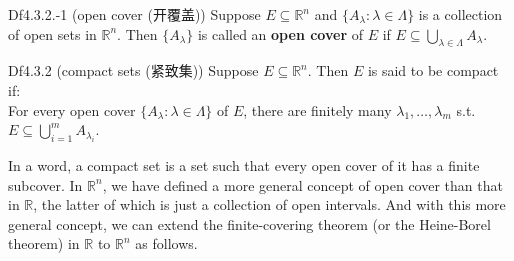 \documentclass{article}
\begin{document}
\begin{Df}{Df4.3.2.-1 (open cover (开覆盖))}
    Suppose $E\subseteq\mathbb{R}^n$ and $\{A_\lambda: \lambda\in\Lambda\}$ is a collection of open sets in $\mathbb{R}^n$. Then $\{A_\lambda\}$ is called an \textbf{open cover} of $E$ if $E\subseteq\bigcup\limits_{\lambda\in\Lambda} A_\lambda$.
\end{Df}

\begin{Df}{Df4.3.2 (compact sets (紧致集))}
    Suppose $E\subseteq\mathbb{R}^n$. Then $E$ is said to be compact if: \\
    For every open cover $\{A_\lambda: \lambda\in\Lambda\}$ of $E$, there are finitely many $\lambda_1, \dots, \lambda_m$ s.t. $E\subseteq \bigcup_{i=1}^m A_{\lambda_i}$.
\end{Df}

\begin{Rmk}{}
    In a word, a compact set is a set such that every open cover of it has a finite subcover. In $\mathbb{R}^n$, we have defined a more general concept of open cover than that in $\mathbb{R}$, the latter of which is just a collection of open intervals. And with this more general concept, we can extend the finite-covering theorem (or the Heine-Borel theorem) in $\mathbb{R}$ to $\mathbb{R}^n$ as follows.
\end{Rmk}
\end{document}
